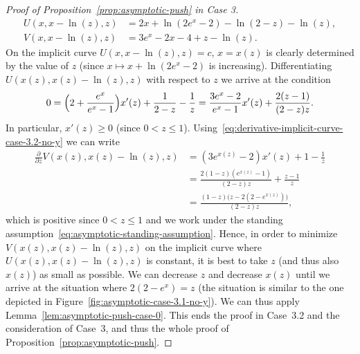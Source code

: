 \documentclass[a4paper]{amsart} %
\theoremstyle{definition}
\theoremstyle{remark}
\numberwithin{equation}{section}
\newcommand*{\XXXasymptoticDenominator}{V}
\newcommand*{\XXXasymptoticNominator}{U}
\begin{document}
\begin{proof}[Proof of Proposition~\ref{prop:asymptotic-push} in Case 3]
\begin{align*}
	\XXXasymptoticNominator(x,x - \ln(z), z)   &= 2x + \ln(2e^x-2) - \ln(2-z)  - \ln(z),\\
	\XXXasymptoticDenominator(x,x -\ln(z), z) &= 3e^x - 2x - 4   + z -\ln(z).
	\end{align*}
	On the implicit curve $\XXXasymptoticNominator(x,x - \ln(z), z) = c $,
	$x=x(z)$ is clearly determined by the value of $z$
	(since $x\mapsto x +\ln(2e^x -2)$ is increasing).
	Differentiating  $\XXXasymptoticNominator(x(z),x(z) - \ln(z), z)$
	with respect to $z$ we arrive at the condition
	\begin{equation}
	\label{eq:derivative-implicit-curve-case-3.2-no-y}
	0 = \Bigl(2 + \frac{e^x}{e^x - 1}\Bigr) x'(z) + \frac{1}{2-z} - \frac{1}{z} = \frac{3e^x - 2 }{e^x - 1}x'(z) +\frac{2(z-1)}{(2-z)z}.
	\end{equation}
	In particular, $x'(z) \geq 0$ (since $0<z\leq 1$).
	Using~\eqref{eq:derivative-implicit-curve-case-3.2-no-y} we can write
	\begin{align*}
	\frac{\partial }{\partial z} \XXXasymptoticDenominator(x(z),x(z)-\ln(z), z) 
	&=(3e^{x(z)} -2) x'(z) + 1 - \frac{1}{z}\\
	&=   \frac{2(1-z)(e^{x(z)} -1)}{(2-z)z} + \frac{z-1}{z}\\
	&= \frac{(1-z)\bigl( z - 2(2-e^{x(z)})\bigr)}{(2-z)z}, 
	\end{align*}
	which is positive since $0<z\leq 1$ 
	and we work under the standing assumption~\eqref{eq:asymptotic-standing-assumption}.
	Hence, in order to minimize $\XXXasymptoticDenominator(x(z),x(z)-\ln(z), z)$
	on the implicit curve where $\XXXasymptoticNominator(x(z),x(z) - \ln(z), z)$ is constant,
	it is best to take $z$ (and thus also $x(z)$) as small as possible.
	We can decrease $z$ and decrease $x(z)$ until we arrive at the situation where $2(2-e^x)  = z$
	 (the situation is similar to the one depicted in Figure~\ref{fig:asymptotic-case-3.1-no-y}).
	We can thus apply Lemma~\ref{lem:asymptotic-push-case-0}.
	This ends the proof in Case~3.2 and the consideration of Case~3, and  thus the whole proof of Proposition~\ref{prop:asymptotic-push}.
\end{proof}






\end{document}
